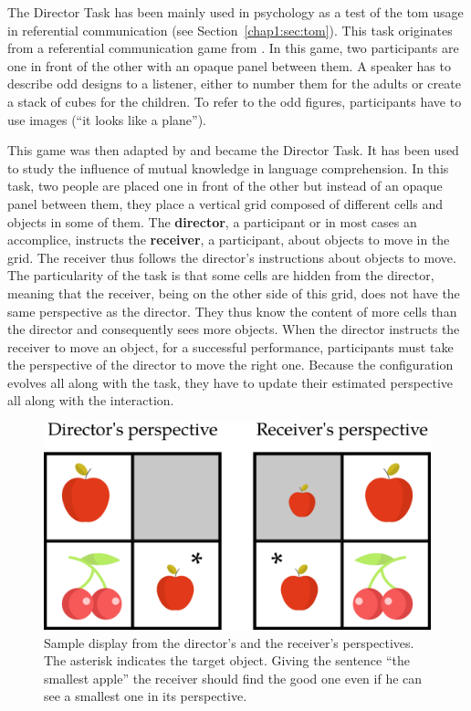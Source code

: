 \documentclass[a4paper,11pt,twoside]{StyleThese}
\begin{document}
The Director Task has been mainly used in psychology as a test of the \acrfull{tom} usage in referential communication (see Section~\ref{chap1:sec:tom}). This task originates from a referential communication game from \cite{krauss_1977_social}. In this game, two participants are one in front of the other with an opaque panel between them. A speaker has to describe odd designs to a listener, either to number them for the adults or create a stack of cubes for the children. To refer to the odd figures, participants have to use images (\eg ``it looks like a plane'').

This game was then adapted by \citep{keysar_2000_taking} and became the Director Task. It has been used to study the influence of mutual knowledge in language comprehension. In this task, two people are placed one in front of the other but instead of an opaque panel between them, they place a vertical grid composed of different cells and objects in some of them. The \textbf{director}, a participant or in most cases an accomplice, instructs the \textbf{receiver}, a participant, about objects to move in the grid. The receiver thus follows the director's instructions about objects to move. The particularity of the task is that some cells are hidden from the director, meaning that the receiver, being on the other side of this grid, does not have the same perspective as the director. They thus know the content of more cells than the director and consequently sees more objects. When the director instructs the receiver to move an object, for a successful performance, participants must take the perspective of the director to move the right one. Because the configuration evolves all along with the task, they have to update their estimated perspective all along with the interaction.

\begin{figure}[ht!]
	\centering
	\includegraphics[scale=0.25]{figures/chapter4/dt_apple.png}
	\caption{\label{chap9:fig:dt_apple} Sample display from the director's and the receiver's perspectives. The asterisk indicates the target object. Giving the sentence ``the smallest apple'' the receiver should find the good one even if he can see a smallest one in its perspective. }
\end{figure}
\end{document}

